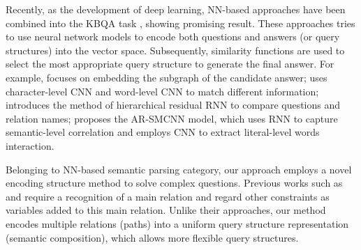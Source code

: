 Recently, as the development of deep learning,
NN-based approaches have been combined into the KBQA task \cite{bordes2014open}, showing promising result.
These approaches tries to use neural network models to encode both questions and answers (or query structures) into the vector space.
Subsequently, similarity functions are used to select the most appropriate query structure to generate the final answer.
For example,
\citet{bordes2014open}  focuses on embedding the subgraph of the candidate answer;
\citet{yin2016simple}  uses character-level CNN and word-level CNN to match different information;
\citet{yu2017improved} introduces the method of hierarchical residual RNN to compare questions and relation names; 
\citet{qu2018question} proposes the AR-SMCNN model, which uses RNN to capture semantic-level correlation and employs CNN to extract literal-level words interaction. 


Belonging to NN-based semantic parsing category, 
our approach employs a novel encoding structure method to solve complex questions.
Previous works such as \citet{yih2015semantic} and \citet{bao2016constraint}
require a recognition of a main relation and regard other constraints as variables added to this main relation.
Unlike their approaches, our method encodes multiple relations (paths) into a uniform query structure representation (semantic composition),  which allows more flexible query structures. 

